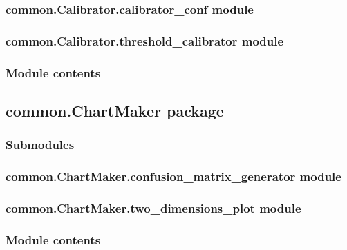\documentclass[letterpaper,10pt,english]{sphinxmanual}
\begin{document}
\subsubsection{common.Calibrator.calibrator\_conf module}
\label{\detokenize{common.Calibrator:common-calibrator-calibrator-conf-module}}

\subsubsection{common.Calibrator.threshold\_calibrator module}
\label{\detokenize{common.Calibrator:common-calibrator-threshold-calibrator-module}}

\subsubsection{Module contents}
\label{\detokenize{common.Calibrator:module-common.Calibrator}}\label{\detokenize{common.Calibrator:module-contents}}

\subsection{common.ChartMaker package}
\label{\detokenize{common.ChartMaker:common-chartmaker-package}}\label{\detokenize{common.ChartMaker::doc}}

\subsubsection{Submodules}
\label{\detokenize{common.ChartMaker:submodules}}

\subsubsection{common.ChartMaker.confusion\_matrix\_generator module}
\label{\detokenize{common.ChartMaker:common-chartmaker-confusion-matrix-generator-module}}

\subsubsection{common.ChartMaker.two\_dimensions\_plot module}
\label{\detokenize{common.ChartMaker:common-chartmaker-two-dimensions-plot-module}}

\subsubsection{Module contents}
\label{\detokenize{common.ChartMaker:module-common.ChartMaker}}\label{\detokenize{common.ChartMaker:module-contents}}
\end{document}
